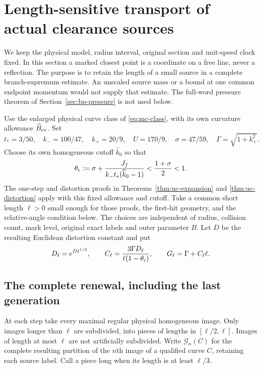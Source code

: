 \section{Length-sensitive transport of actual clearance sources}
\label{sec:lc-length}

We keep the physical model, radius interval, original section and unit-speed
clock fixed.  In this section a marked closest point is a coordinate on a
free line, never a reflection.  The purpose is to retain the length of a
small source in a complete branch-supremum estimate.  An unscaled source
mass or a bound at one common endpoint momentum would not supply that
estimate.  The full-word pressure theorem of Section~\ref{sec:bp-pressure}
is not used below.

Use the enlarged physical curve class of \eqref{eq:mc-class}, with its own
curvature allowance $\widehat B_{\rm cv}$.  Set
\[
 t_*=3/50,\quad k_-=100/47,\quad k_+=20/9,\quad U=170/9,
 \quad \sigma=47/59,\quad \Gamma=\sqrt{1+k_+^2}.
\]
Choose its own homogeneous cutoff $\widehat k_0$ so that
\begin{equation}\label{eq:lc-theta}
 \theta_{\rm r}:=\sigma+
       \frac{J_f}{k_-t_*(\widehat k_0-1)}
                 <\frac{1+\sigma}{2}<1.
\end{equation}
The one-step and distortion proofs in
Theorems~\ref{thm:uc-expansion} and \ref{thm:uc-distortion} apply with
this fixed allowance and cutoff.  Take a common short length $\ell>0$
small enough for those proofs, the first-hit geometry, and the
relative-angle condition below.  The choices are independent of radius,
collision count, mark level, original exact labels and outer parameter $B$.
Let $D$ be the resulting Euclidean distortion constant and put
\begin{equation}\label{eq:lc-renewal-constants}
 D_\ell=e^{D\ell^{1/3}},\qquad
 C_\ell=\frac{3\Gamma D_\ell}{\ell(1-\theta_{\rm r})},\qquad
 G_\ell=\Gamma+C_\ell\ell.
\end{equation}

\subsection{The complete renewal, including the last generation}

At each step take every maximal regular physical homogeneous image.
Only images longer than $\ell$ are subdivided, into pieces of lengths
in $[\ell/2,\ell]$.  Images of length at most $\ell$ are not artificially
subdivided.  Write $\mathcal G_n(C)$ for the complete resulting partition
of the $n$th image of a qualified curve $C$, retaining each source label.
Call a piece long when its length is at least $\ell/3$.

